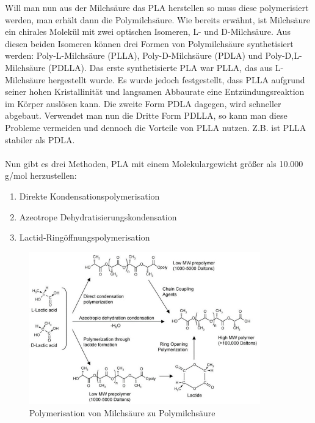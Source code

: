 \documentclass[10pt]{article}
\begin{document}
    Will man nun aus der Milchsäure das PLA herstellen so muss diese polymerisiert werden, man erhält dann die Polymilchsäure.
    Wie bereits erwähnt, ist Milchsäure ein chirales Molekül mit zwei optischen Isomeren, L- und D-Milchsäure.
    Aus diesen beiden Isomeren können drei Formen von Polymilchsäure synthetisiert werden: Poly-L-Milchsäure (PLLA), Poly-D-Milchsäure (PDLA) und Poly-D,L-Milchsäure (PDLLA).
    Das erste synthetisierte PLA war PLLA, das aus L-Milchsäure hergestellt wurde.
    Es wurde jedoch festgestellt, dass PLLA aufgrund seiner hohen Kristallinität und langsamen Abbaurate eine Entzündungsreaktion im Körper auslösen kann.
    Die zweite Form PDLA dagegen, wird schneller abgebaut.
    Verwendet man nun die Dritte Form PDLLA, so kann man diese Probleme vermeiden und dennoch die Vorteile von PLLA nutzen.
    Z.B. ist PLLA stabiler als PDLA. \\ \\
    Nun gibt es drei Methoden, PLA mit einem Molekulargewicht größer als 10.000 g/mol herzustellen:
    \begin{enumerate}
        \item Direkte Kondensationspolymerisation
        \item Azeotrope Dehydratisierungskondensation
        \item Lactid-Ringöffnungspolymerisation
    \end{enumerate}

    \begin{figure}[H]
        \centering
        \includegraphics[width=10cm]{img/Polymerisation}
        \caption*{Polymerisation von Milchsäure zu Polymilchsäure}
    \end{figure}
\end{document}
